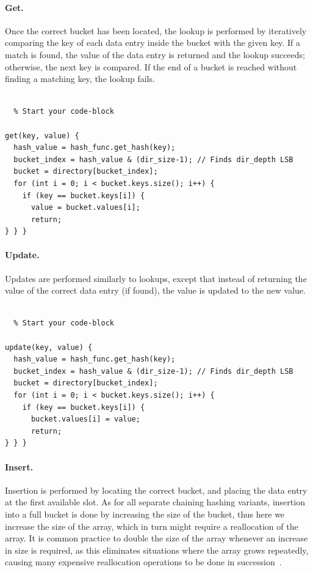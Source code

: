 \documentclass[11pt]{article} %
\begin{document}
\paragraph{Get.} Once the correct bucket has been located, the lookup is performed by iteratively comparing the key of each data entry inside the bucket with the given key. If a match is found, the value of the data entry is returned and the lookup succeeds; otherwise, the next key is compared. If the end of a bucket is reached without finding a matching key, the lookup fails. \\
\\
\begin{fminipage}{\linewidth}
\begin{lstlisting}  % Start your code-block

get(key, value) {
  hash_value = hash_func.get_hash(key);
  bucket_index = hash_value & (dir_size-1); // Finds dir_depth LSB
  bucket = directory[bucket_index];
  for (int i = 0; i < bucket.keys.size(); i++) {
    if (key == bucket.keys[i]) {
      value = bucket.values[i];
      return;
} } }
\end{lstlisting}
\end{fminipage}

\paragraph{Update.} Updates are performed similarly to lookups, except that instead of returning the value of the correct data entry (if found), the value is updated to the new value. \\
\\
\begin{fminipage}{\linewidth}
\begin{lstlisting}  % Start your code-block

update(key, value) {
  hash_value = hash_func.get_hash(key);
  bucket_index = hash_value & (dir_size-1); // Finds dir_depth LSB
  bucket = directory[bucket_index];
  for (int i = 0; i < bucket.keys.size(); i++) {
    if (key == bucket.keys[i]) {
      bucket.values[i] = value;
      return;
} } }
\end{lstlisting}
\end{fminipage}
\paragraph{Insert.} Insertion is performed by locating the correct bucket, and placing the data entry at the first available slot. As for all separate chaining hashing variants, insertion into a full bucket is done by increasing the size of the bucket, thus here we increase the size of the array, which in turn might require a reallocation of the array. It is common practice to double the size of the array whenever an increase in size is required, as this eliminates situations where the array grows repeatedly, causing many expensive reallocation operations to be done in succession~\cite{DPH90}. \\
\end{document}

